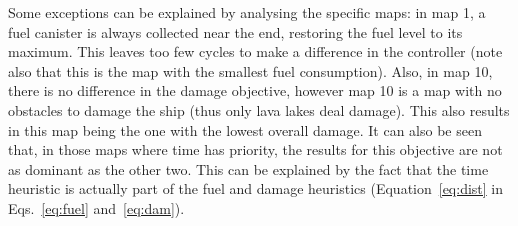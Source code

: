 \documentclass[journal]{IEEEtran}
\begin{document}

Some exceptions can be explained by analysing the specific maps: in map 1, a fuel canister is always collected near the end, restoring the fuel level to its maximum. This leaves too few cycles to make a difference in the controller (note also that this is the map with the smallest fuel consumption). Also, in map 10, there is no difference in the damage objective, however map 10 is a map with no obstacles to damage the ship (thus only lava lakes deal damage). This also results in this map being the one with the lowest overall damage. It can also be seen that, in those maps where time has priority, the results for this objective are not as dominant as the other two. This can be explained by the fact that the time heuristic is actually part of the fuel and damage heuristics (Equation~\ref{eq:dist} in Eqs.~\ref{eq:fuel} and~\ref{eq:dam}).
\end{document}

